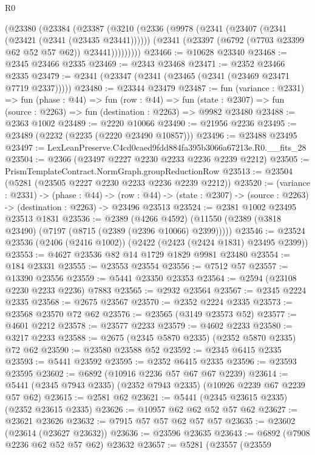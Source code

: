 \begin{lexlean}{R0}
\begin{coremodule}
      (@23380
        (@23384
          (@23387
            (@3210
              (@2336
                (@9978
                  (@2341 (@23407 (@2341 (@23421 (@2341 (@23435 @23441))))))
                  (@2341 (@23397 (@6792 (@7703 @23399 @62 @52 @57 @62)) @23441)))))))))
@23466 := @10628 @23340
@23468 := @2345 @23466 @2335
@23469 := @2343 @23468
@23471 := @2352 @23466 @2335
@23479 := @2341 (@23347 (@2341 (@23465 (@2341 (@23469 @23471 @7719 @2337)))))
@23480 := @23344 @23479
@23487 := fun (variance : @2331) =>
  fun (phase : @44) =>
  fun (row : @44) =>
  fun (state : @2307) => fun (source : @2263) => fun (destination : @2263) => @9982 @23480
@23488 := @2363 @1002
@23489 := @2220 @10066
@23490 := @21956 @2236
@23495 := @23489 (@2232 (@2235 (@2220 @23490 @10857)))
@23496 := @23488 @23495
@23497 := LexLeanPreserve.C4cd0caed9fdd884fa395b3066a67213e.R0.__fits_28
@23504 := @2366 (@23497 @2227 @2230 @2233 @2236 @2239 @2212)
@23505 := PrismTemplateContract.NormGraph.groupReductionRow
@23513 := @23504 (@5281 (@23505 @2227 @2230 @2233 @2236 @2239 @2212))
@23520 := (variance : @2331) ->
  (phase : @44) ->
  (row : @44) -> (state : @2307) -> (source : @2263) -> (destination : @2263) -> @23496 @23513
@23524 := @2381 @1002 @23495 @23513 @1831
@23536 := @2389
    (@4266 @4592)
    (@11550 (@2389 (@3818 @23490) (@7197 (@8715 (@2389 (@2396 @10066) @2399)))))
@23546 := @23524 @23536 (@2406 (@2416 @1002)) (@2422 (@2423 (@2424 @1831) @23495 @2399))
@23553 := @4627 @23536 @82 @14 @1729 @1829 @9981 @23480
@23554 := @184 @23331
@23555 := @23553 @23554
@23556 := @7512 @57
@23557 := @13390 @23556
@23559 := @5441 @23350 @23353
@23564 := @2594 (@23108 @2230 @2233 @2236) @7883
@23565 := @2932 @23564
@23567 := @2345 @2224 @2335
@23568 := @2675 @23567
@23570 := @2352 @2224 @2335
@23573 := @23568 @23570 @72 @62
@23576 := @23565 (@3149 @23573 @52)
@23577 := @4601 @2212
@23578 := @23577 @2233
@23579 := @4602 @2233
@23580 := @3217 @2233
@23588 := @2675 (@2345 @5870 @2335) (@2352 @5870 @2335) @72 @62
@23590 := @23580 @23588 @52
@23592 := @2345 @6415 @2335
@23593 := @5441 @23592
@23595 := @2352 @6415 @2335
@23596 := @23593 @23595
@23602 := @6892 (@10916 @2236 @57 @67 @67 @2239)
@23614 := @5441 (@2345 @7943 @2335) (@2352 @7943 @2335) (@10926 @2239 @67 @2239 @57 @62)
@23615 := @2581 @62
@23621 := @5441 (@2345 @23615 @2335) (@2352 @23615 @2335)
@23626 := @10957 @62 @62 @52 @57 @62
@23627 := @23621 @23626
@23632 := @7915 @57 @57 @62 @57 @57
@23635 := @23602 (@23614 (@23627 @23632))
@23636 := @23596 @23635
@23643 := @6892 (@7908 @2236 @62 @52 @57 @62) @23632
@23657 := @5281
    (@23557
      (@23559

\end{coremodule}
\end{lexlean}
